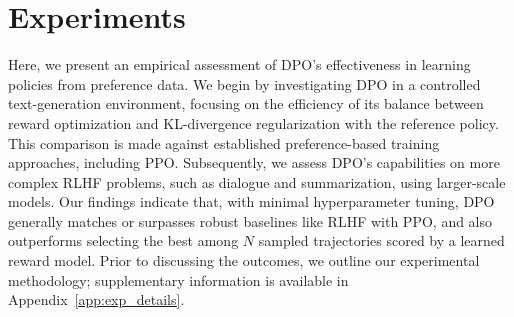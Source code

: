 \section{Experiments}
Here, we present an empirical assessment of DPO’s effectiveness in learning policies from preference data. We begin by investigating DPO in a controlled text-generation environment, focusing on the efficiency of its balance between reward optimization and KL-divergence regularization with the reference policy. This comparison is made against established preference-based training approaches, including PPO. Subsequently, we assess DPO’s capabilities on more complex RLHF problems, such as dialogue and summarization, using larger-scale models. Our findings indicate that, with minimal hyperparameter tuning, DPO generally matches or surpasses robust baselines like RLHF with PPO, and also outperforms selecting the best among $N$ sampled trajectories scored by a learned reward model. Prior to discussing the outcomes, we outline our experimental methodology; supplementary information is available in Appendix~\ref{app:exp_details}.

